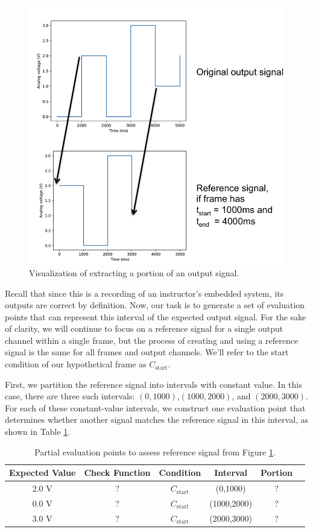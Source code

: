 \documentclass[12pt]{article}
\begin{document}
\begin{figure}[ht]
\centering
\includegraphics[width=0.6\linewidth]{output-framing.png}
\caption{Visualization of extracting a portion of an output signal.}
\label{fig:output-framing}
\end{figure}

Recall that since this is a recording of an instructor's embedded system, its outputs are correct by definition.  Now, our task is to generate a set of evaluation points that can represent this interval of the expected output signal.  For the sake of clarity, we will continue to focus on a reference signal for a single output channel within a single frame, but the process of creating and using a reference signal is the same for all frames and output channels.  We'll refer to the start condition of our hypothetical frame as $C_{\text{start}}$.

First, we partition the reference signal into intervals with constant value.  In this case, there are three such intervals: $(0,1000)$,$(1000,2000)$, and $(2000,3000)$.  For each of these constant-value intervals, we construct one evaluation point that determines whether another signal matches the reference signal in this interval, as shown in Table \ref{table:construct-points}.

\begin{table}[ht]
\begin{center}
\caption{Partial evaluation points to assess reference signal from Figure \ref{fig:output-framing}.}
\vspace{2mm}
\label{table:construct-points}
\begin{tabular}{cccccc}
Expected Value & Check Function & Condition & Interval & Portion \\ \hline
2.0 V & ? & $C_{\text{start}}$ & (0,1000) & ? \\
0.0 V & ? & $C_{\text{start}}$ & (1000,2000) & ? \\
3.0 V & ? & $C_{\text{start}}$ & (2000,3000) & ? \\ \hline
\end{tabular}
\end{center}
\end{table}
\end{document}
